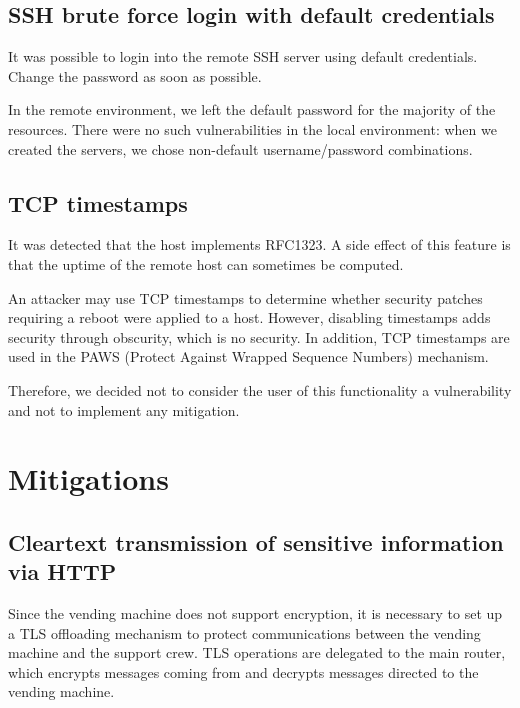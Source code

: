 \documentclass[draft]{homework}
\begin{document}
    \subsection{SSH brute force login with default credentials}
    \begin{displayquote}
        It was possible to login into the remote SSH server using default credentials.
       \textelp{}
       Change the password as soon as possible.
    \end{displayquote}
    In the remote environment, we left the default password for the majority of the resources.
    There were no such vulnerabilities in the local environment: when we created the servers, we chose non-default username/password combinations.
    
    \subsection{TCP timestamps}
    \begin{displayquote}
        It was detected that the host implements RFC1323.
        \textelp{}
        A side effect of this feature is that the uptime of the remote host can sometimes be computed.
    \end{displayquote}
    
    An attacker may use TCP timestamps to determine whether security patches requiring a reboot were applied to a host.
    However, disabling timestamps adds security through obscurity, which is no security. 
    In addition, TCP timestamps are used in the PAWS (Protect Against Wrapped Sequence Numbers) mechanism.
    
    Therefore, we decided not to consider the user of this functionality a vulnerability and not to implement any mitigation.
    
    
    \section{Mitigations}
    \subsection{Cleartext transmission of sensitive information via HTTP}\label{sec:http-mitigation}
    Since the vending machine does not support encryption, it is necessary to set up a TLS offloading mechanism to protect communications between the vending machine and the support crew.
    TLS operations are delegated to the main router, which encrypts messages coming from and decrypts messages directed to the vending machine. 
    
\end{document}
